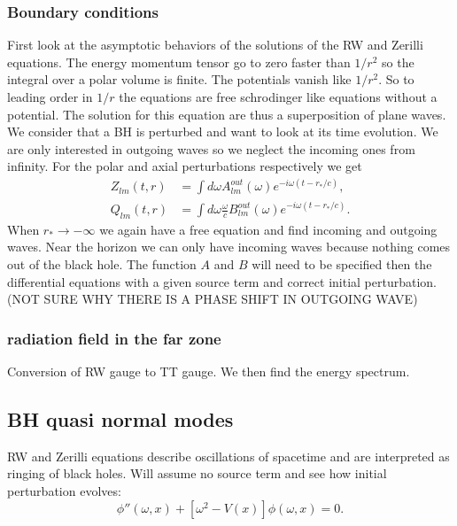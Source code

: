 \documentclass[12 pt]{article}
\begin{document}
	\subsubsection{Boundary conditions}
	
	First look at the asymptotic behaviors of the solutions of the RW and Zerilli equations. The energy momentum tensor go to zero faster than $1/r^2$ so the integral over a polar volume is finite. The potentials vanish like $1/r^2$. So to leading order in $1/r$ the equations are free schrodinger like equations without a potential. The solution for this equation are thus a superposition of plane waves. 
	We consider that a BH is perturbed and want to look at its time evolution. We are only interested in outgoing waves so we neglect the incoming ones from infinity. For the polar and axial perturbations respectively we get
	\begin{align}
		Z_{lm}(t,r) &= \int d\omega A_{lm}^{out}(\omega) e^{-i \omega (t-r_*/c)}, \\
		Q_{lm}(t,r) &= \int d\omega \frac{\omega}{c} B_{lm}^{out}(\omega) e^{-i \omega (t-r_*/c)}.
	\end{align}
	When $r_* \longrightarrow -\infty$ we again have a free equation and find incoming and outgoing waves. Near the horizon we can only have incoming waves because nothing comes out of the black hole. The function $A$ and $B$ will need to be specified then the differential equations with a given source term and correct initial perturbation. (NOT SURE WHY THERE IS A PHASE SHIFT IN OUTGOING WAVE)
	
	\subsubsection{radiation field in the far zone}
	
	Conversion of RW gauge to TT gauge. We then find the energy spectrum. 
	
	\subsection{BH quasi normal modes}
	
	RW and Zerilli equations describe oscillations of spacetime and are interpreted as ringing of black holes.
	Will assume no source term and see how initial perturbation evolves:
	\begin{equation}
		\phi''(\omega, x) + [\omega^2 -V(x)]\phi(\omega,x) = 0.
	\end{equation}
	
\end{document}
